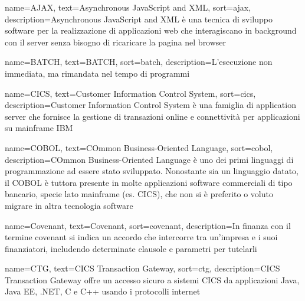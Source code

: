 
%
%


{
    name=AJAX,
    text=Asynchronous JavaScript and XML,
    sort=ajax,
    description={Asynchronous JavaScript and XML è una tecnica di sviluppo software per la realizzazione di applicazioni web che interagiscano in background con il server senza bisogno di ricaricare la pagina nel browser}
}

{
    name=BATCH,
    text=BATCH,
    sort=batch,
    description={L'esecuzione non immediata, ma rimandata nel tempo di programmi}
}

{
    name=CICS,
    text=Customer Information Control System,
    sort=cics,
    description={Customer Information Control System è una famiglia di application server che fornisce la gestione di transazioni online e connettività per applicazioni su mainframe IBM}
}

{
    name=COBOL,
    text=COmmon Business-Oriented Language,
    sort=cobol,
    description={COmmon Business-Oriented Language è uno dei primi linguaggi di programmazione ad essere stato sviluppato. Nonostante sia un linguaggio datato, il COBOL è tuttora presente in molte applicazioni software commerciali di tipo bancario, specie lato mainframe (es. CICS), che non si è preferito o voluto migrare in altra tecnologia software}
}

{
    name=Covenant,
    text=Covenant,
    sort=covenant,
    description={In finanza con il termine covenant si indica un accordo che intercorre tra un'impresa e i suoi finanziatori, includendo determinate clausole e parametri per tutelarli}
}

{
    name=CTG,
    text=CICS Transaction Gateway,
    sort=ctg,
    description={CICS Transaction Gateway offre un accesso sicuro a sistemi CICS da applicazioni Java, Java EE, .NET, C e C++ usando i protocolli internet}
}
 

